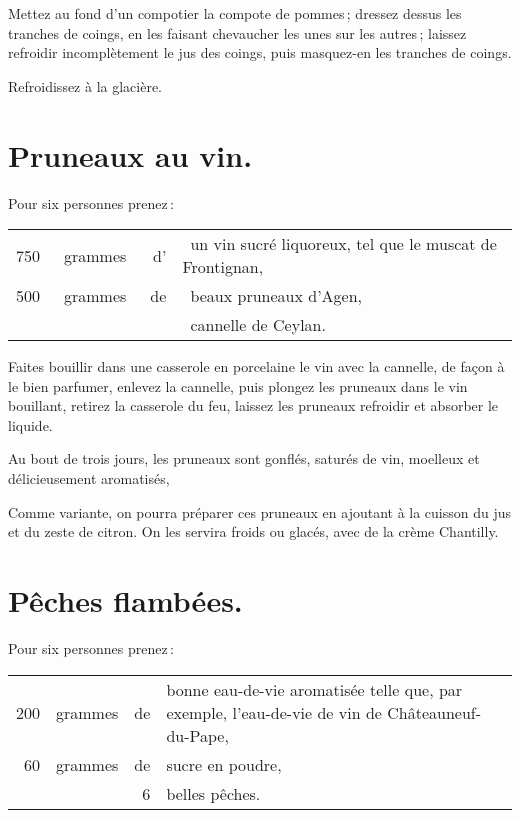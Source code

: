 Mettez au fond d'un compotier la compote de pommes ; dressez dessus les
tranches de coings, en les faisant chevaucher les unes sur les autres ; laissez
refroidir incomplètement le jus des coings, puis masquez-en les tranches de
coings.

Refroidissez à la glacière.

\section*{\centering Pruneaux au vin.}
{}

Pour six personnes prenez :

\footnotesize
\begin{longtable}{rrrp{16em}}
    750 & grammes & d' & un vin sucré liquoreux, tel que le muscat de Frontignan,                         \\
    500 & grammes & de & beaux pruneaux d'Agen,                                                           \\
        &         &    & cannelle de Ceylan.                                                              \\
\end{longtable}
\normalsize

Faites bouillir dans une casserole en porcelaine le vin avec la cannelle, de
façon à le bien parfumer, enlevez la cannelle, puis plongez les pruneaux dans
le vin bouillant, retirez la casserole du feu, laissez les pruneaux refroidir
et absorber le liquide.

Au bout de trois jours, les pruneaux sont gonflés, saturés de vin, moelleux et
délicieusement aromatisés,

\sk

Comme variante, on pourra préparer ces pruneaux en ajoutant à la cuisson du jus
et du zeste de citron. On les servira froids ou glacés, avec de la crème
Chantilly.

\section*{\centering Pêches flambées.}
{}

Pour six personnes prenez :

\footnotesize
\begin{longtable}{rrrp{16em}}
    200 & grammes & de & bonne eau-de-vie aromatisée telle que, par exemple,
                         l'eau-de-vie de vin de Châteauneuf-du-Pape,                                      \\
     60 & grammes & de & sucre en poudre,                                                                 \\
        &         &  6 & belles pêches.                                                                   \\
\end{longtable}
\normalsize

